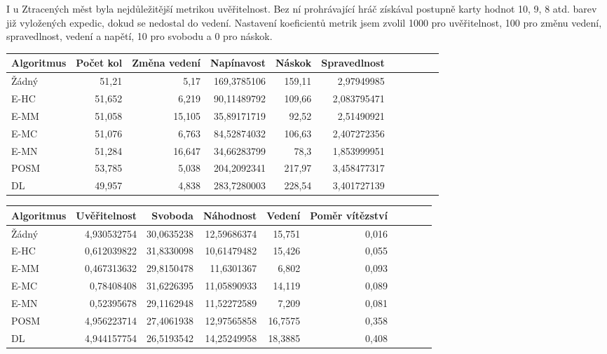I u Ztracených měst byla nejdůležitější metrikou uvěřitelnost. Bez ní prohrávající hráč získával postupně karty hodnot 10, 9, 8 atd. barev již vyložených expedic, dokud se nedostal do vedení. Nastavení koeficientů metrik jsem zvolil 1000 pro uvěřitelnost, 100 pro změnu vedení, spravedlnost, vedení a napětí, 10 pro svobodu a 0 pro náskok.

\begin{table*}[b]\footnotesize
\vspace*{0mm}
\caption{{\label{tab-lcm}} Porovnání metrik zábavnosti u jednotlivých algoritmů ve hře Ztracená města. Metriky změna vedení a svoboda se maximalizují, zbytek minimalizuje.}
\vspace*{0mm}
\label{shadowtable}
\begin{center}
\begin{tabular}{| l || r | r | r | r | r | r | r | r | r | r |}
\hline
Algoritmus & Počet kol	& Změna vedení & Napínavost & Náskok & Spravedlnost\\
\hline
\hline
Žádný & 51,21 & 5,17 & 169,3785106 & 159,11 & 2,97949985 \\ \hline  
E-HC & 51,652 & 6,219 & 90,11489792 & 109,66 & 2,083795471 \\ \hline  
E-MM & 51,058 & 15,105 & 35,89171719 & 92,52 & 2,51490921 \\ \hline  
E-MC & 51,076 & 6,763 & 84,52874032 & 106,63 & 2,407272356 \\ \hline  
E-MN & 51,284 & 16,647 & 34,66283799 & 78,3 & 1,853999951 \\ \hline  
POSM & 53,785 & 5,038 & 204,2092341 & 217,97 & 3,458477317 \\ \hline  
DL & 49,957 & 4,838 & 283,7280003 & 228,54 & 3,401727139 \\ \hline  
\end{tabular}
\end{center}
\begin{center}
\begin{tabular}{| l || r | r | r | r | r | r | r | r | r |}
\hline
Algoritmus & Uvěřitelnost & Svoboda & Náhodnost & Vedení &	Poměr vítězství \\
\hline
\hline
Žádný & 4,930532754 & 30,0635238 & 12,59686374 & 15,751 & 0,016 \\ \hline  
E-HC & 0,612039822 & 31,8330098 & 10,61479482 & 15,426 & 0,055 \\ \hline  
E-MM & 0,467313632 & 29,8150478 & 11,6301367 & 6,802 & 0,093 \\ \hline  
E-MC & 0,78408408 & 31,6226395 & 11,05890933 & 14,119 & 0,089 \\ \hline  
E-MN & 0,52395678 & 29,1162948 & 11,52272589 & 7,209 & 0,081 \\ \hline  
POSM & 4,956223714 & 27,4061938 & 12,97565858 & 16,7575 & 0,358 \\ \hline  
DL & 4,944157754 & 26,5193542 & 14,25249958 & 18,3885 & 0,408 \\ \hline  
\end{tabular}
\end{center}
\end{table*}

